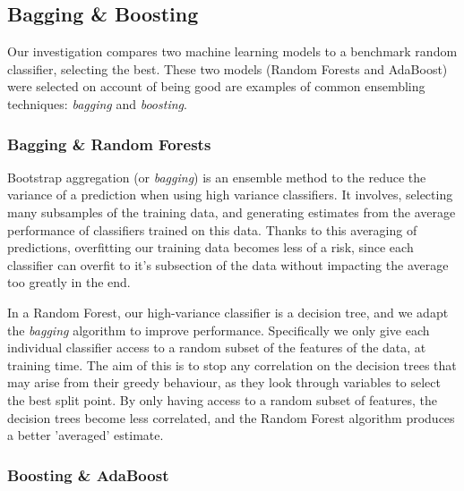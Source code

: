 \documentclass{bioinfo}
\begin{document}

\subsection{Bagging \& Boosting}
Our investigation compares two machine learning models to a benchmark random classifier, selecting the best. 
These two models (Random Forests and AdaBoost) were selected on account of being good are examples of common ensembling techniques: \textit{bagging} and \textit{boosting}.

\subsubsection{Bagging \& Random Forests}

Bootstrap aggregation (or \textit{bagging}) is an ensemble method to the reduce the variance of a prediction when using high variance classifiers. 
It involves, selecting many subsamples of the training data, and generating estimates from the average performance of classifiers trained on this data. 
Thanks to this averaging of predictions, overfitting our training data becomes less of a risk, since each classifier can overfit to it's subsection of the data without impacting the average too greatly in the end.

In a Random Forest, our high-variance classifier is a decision tree, and we adapt the \textit{bagging} algorithm to improve performance.
Specifically we only give each individual classifier access to a random subset of the features of the data, at training time.
The aim of this is to stop any correlation on the decision trees that may arise from their greedy behaviour, as they look through variables to select the best split point. 
By only having access to a random subset of features, the decision trees become less correlated, and the Random Forest algorithm produces a better 'averaged' estimate.

\subsubsection{Boosting \& AdaBoost}
\end{document}
